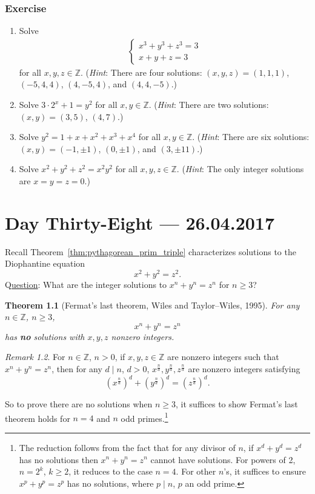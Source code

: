 \documentclass{amsbook}
\theoremstyle{plain}
\newtheorem{theorem}{Theorem}[chapter] %
\theoremstyle{definition}
\theoremstyle{remark}
\newtheorem{remark}[theorem]{Remark}
\numberwithin{equation}{chapter}
\numberwithin{figure}{chapter}
\newcommand{\Z}{\mathbb{Z}}
\begin{document}
\subsection*{Exercise}
\begin{enumerate}
\item Solve 
  \begin{align}
    \left\{ \begin{array}{r}
              x^3 + y^3 + z^3 = 3 \\
              x + y + z = 3
            \end{array}
    \right.
  \end{align}
  for all $x, y, z \in \Z$. (\emph{Hint}: There are four solutions: $(x, y, z) = (1,1,1)$, $(-5,4,4)$, $(4,-5,4)$, and $(4,4,-5)$.)
\item Solve $3 \cdot 2^x + 1 = y^2$ for all $x, y \in \Z$. (\emph{Hint}: There are two solutions: $(x, y) = (3, 5)$, $(4, 7)$.)
\item Solve $y^2 = 1 + x + x^2 + x^3 + x^4$ for all $x, y \in \Z$. (\emph{Hint}: There are six solutions: $(x, y) = (-1, \pm 1)$, $(0, \pm 1)$, and $(3, \pm 11)$.)
\item Solve $x^2 + y^2 + z^2 = x^2 y^2$ for all $x, y, z \in \Z$. (\emph{Hint}: The only integer solutions are $x = y = z = 0$.)
\end{enumerate}


\chapter[Lecture Thirty-Eight]{Day Thirty-Eight \hfill {\footnotesize \rm --- 26.04.2017}}

Recall Theorem~\ref{thm:pythagorean_prim_triple} characterizes solutions to the Diophantine equation 
\[
x^2 + y^2 = z^2.
\]
Q\underline{uestion}: What are the integer  solutions to $x^n + y^n = z^n$ for $n \geqslant 3$?
\begin{theorem}[Fermat's last theorem, Wiles and Taylor--Wiles, 1995]\label{thm:fermat_last_thm}
  For any $n \in \Z$, $n \geqslant 3$, 
\[
x^n + y^n = z^n
\]
has \textbf{no} solutions with $x, y, z$ nonzero integers.   
\end{theorem}
\begin{remark}
For $n \in \Z$, $n > 0$, if $x, y, z \in \Z$ are nonzero integers such that $x^n + y^n = z^n$, then for any $d \mid n$, $d > 0$, $x^{\frac{n}d}, y^{\frac{n}d}, z^{\frac{n}d}$ are nonzero integers satisfying 
\[
\left( x^{\frac{n}d} \right)^d + \left( y^{\frac{n}d} \right)^d = \left( z^{\frac{n}d} \right)^d.
\]

So to prove there are no solutions when $n \geqslant 3$, it suffices to show Fermat's last theorem holds for $n = 4$ and $n$ odd primes.\footnote{The reduction follows from the fact that for any divisor of $n$, if $x^d + y^d = z^d$ has no solutions then $x^n + y^n = z^n$ cannot have solutions. For powers of 2, $n = 2^k$, $k \geqslant 2$, it reduces to the case $n = 4$. For other $n$'s, it suffices to ensure $x^p + y^p = z^p$ has no solutions, where $p \mid n$, $p$ an odd prime.}  
\end{remark}
\end{document}
